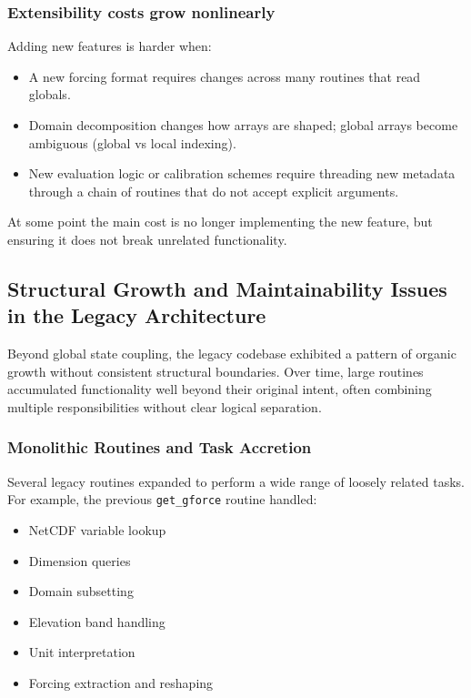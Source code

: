 \documentclass[11pt]{scrartcl}
\begin{document}
\subsubsection{Extensibility costs grow nonlinearly}

Adding new features is harder when:
\begin{itemize}[leftmargin=*]
\item A new forcing format requires changes across many routines that read globals.
\item Domain decomposition changes how arrays are shaped; global arrays become ambiguous
      (global vs local indexing).
\item New evaluation logic or calibration schemes require threading new metadata through
      a chain of routines that do not accept explicit arguments.
\end{itemize}

At some point the main cost is no longer implementing the new feature, but ensuring it
does not break unrelated functionality.

\subsection{Structural Growth and Maintainability Issues in the Legacy Architecture}

Beyond global state coupling, the legacy codebase exhibited a pattern of
organic growth without consistent structural boundaries. Over time, large
routines accumulated functionality well beyond their original intent,
often combining multiple responsibilities without clear logical separation.

\subsubsection{Monolithic Routines and Task Accretion}

Several legacy routines expanded to perform a wide range of loosely related
tasks. For example, the previous \texttt{get\_gforce} routine handled:

\begin{itemize}
\item NetCDF variable lookup
\item Dimension queries
\item Domain subsetting
\item Elevation band handling
\item Unit interpretation
\item Forcing extraction and reshaping
\end{itemize}
\end{document}
